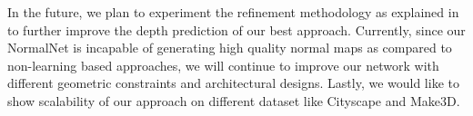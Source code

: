 \documentclass[10pt,twocolumn,letterpaper]{article}
\begin{document}
In the future, we plan to experiment the refinement methodology as explained in \cite{casser2018depth} to further improve the depth prediction of our best approach. Currently, since our NormalNet is incapable of generating high quality normal maps as compared to non-learning based approaches, we will continue to improve our network with different geometric constraints and architectural designs. Lastly, we would like to show scalability of our approach on different dataset like Cityscape and Make3D.









{\small


}
\end{document}
